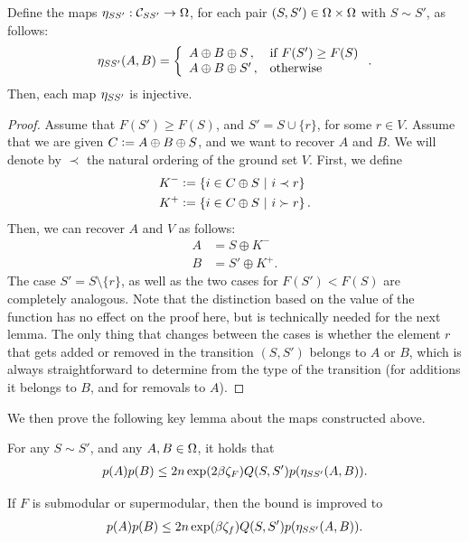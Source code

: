 \begin{lemma} \label{lem:inj}
Define the maps $\ess : \mathcal{C}_{SS'} \to \ss$, for each pair $(S, S') \in \ss \times \ss$ with $S \sim S'$, as follows:
\begin{align*}
  \ess(A, B) = \twopartdefo{A \oplus B \oplus S}{F(S') \geq F(S)}{A \oplus B \oplus S'}.
\end{align*}
Then, each map $\ess$ is injective.
\end{lemma}

\begin{proof}
  Assume that $F(S') \geq F(S)$, and $S' = S \cup \{r\}$, for some $r \in V$.
  Assume that we are given $C \defeq A \oplus B \oplus S$, and we want to recover $A$ and $B$.
  We will denote by $\prec$ the natural ordering of the ground set $V$.
  First, we define
  \begin{align*}
    K^- &\defeq \sdef{i \in C \oplus S}{i \prec r}\\
    K^+ &\defeq \sdef{i \in C \oplus S}{i \succ r}.
  \end{align*}
  Then, we can recover $A$ and $V$ as follows:
  \begin{align*}
    A &= S \oplus K^-\\
    B &= S' \oplus K^+.
  \end{align*}
  The case $S' = S \setminus \{r\}$, as well as the two cases for $F(S') < F(S)$ are completely analogous.
  Note that the distinction based on the value of the function has no effect on the proof here, but is technically needed for the next lemma.
  The only thing that changes between the cases is whether the element $r$ that gets added or removed in the transition $(S, S')$ belongs to $A$ or $B$, which is always straightforward to determine from the type of the transition (for additions it belongs to $B$, and for removals to $A$).
\end{proof}
\noindent We then prove the following key lemma about the maps constructed above.
\begin{lemma} \label{lem:poly_full}
  For any $S \sim S'$, and any $A, B \in \ss$, it holds that
  \begin{align*}
    p(A)p(B) \leq 2n\exp(2 \beta \zf)Q(S, S')p(\ess(A, B)).
  \end{align*}
  
  If $F$ is submodular or supermodular, then the bound is improved to
  \begin{align*}
  	p(A)p(B) \leq 2n\exp(\beta \zeta_f)Q(S, S')p(\ess(A, B)).
  \end{align*}
\end{lemma}
